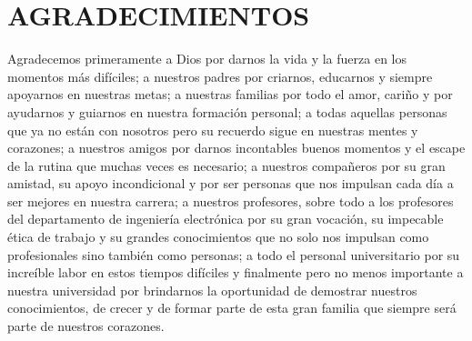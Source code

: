 
\thispagestyle{empty}
\section*{AGRADECIMIENTOS}

    Agradecemos primeramente a Dios por darnos la vida y la  fuerza en los momentos
    más difíciles; a nuestros padres por criarnos, educarnos y siempre apoyarnos en
    nuestras metas; a nuestras familias por todo el amor, cariño y por ayudarnos y
    guiarnos en nuestra formación personal; a todas aquellas personas que ya no
    están con nosotros pero su recuerdo sigue en nuestras mentes y corazones; a
    nuestros amigos por darnos incontables buenos momentos y el escape de la rutina
    que muchas veces es necesario; a nuestros compañeros por su gran amistad, su
    apoyo incondicional y por ser personas que nos impulsan cada día a ser mejores
    en nuestra carrera; a nuestros profesores, sobre todo a los profesores del
    departamento de ingeniería electrónica por su gran vocación, su impecable ética
    de trabajo y su grandes conocimientos que no solo nos impulsan como
    profesionales sino también como  personas; a todo el personal universitario por
    su increíble labor en estos tiempos difíciles y finalmente pero no menos
    importante a nuestra universidad por brindarnos la oportunidad de demostrar
    nuestros conocimientos, de crecer y de formar parte de esta gran familia que
    siempre será parte de nuestros corazones.

